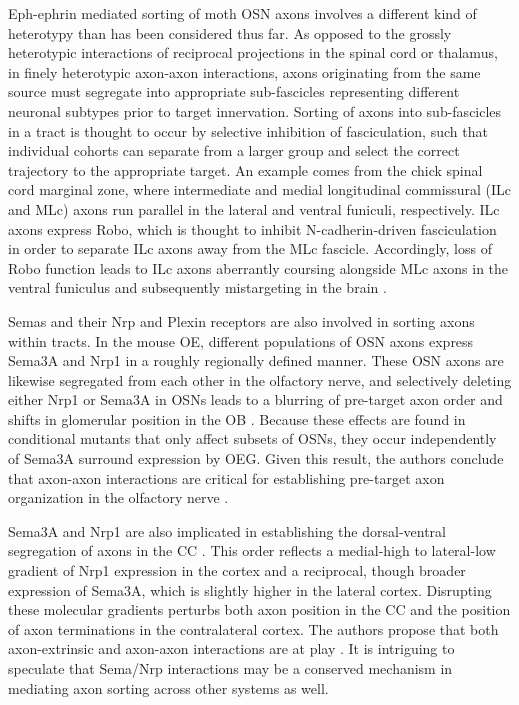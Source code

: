 Eph-ephrin mediated sorting of moth OSN axons involves a different kind of heterotypy than has been considered thus far.
As opposed to the grossly heterotypic interactions of reciprocal projections in the spinal cord or thalamus, in finely heterotypic axon-axon interactions, axons originating from the same source must segregate into appropriate sub-fascicles representing different neuronal subtypes prior to target innervation.
Sorting of axons into sub-fascicles in a tract is thought to occur by selective inhibition of fasciculation, such that individual cohorts can separate from a larger group and select the correct trajectory to the appropriate target.
An example comes from the chick spinal cord marginal zone, where intermediate and medial longitudinal commissural (ILc and MLc) axons run parallel in the lateral and ventral funiculi, respectively.
ILc axons express Robo, which is thought to inhibit N-cadherin-driven fasciculation in order to separate ILc axons away from the MLc fascicle.
Accordingly, loss of Robo function leads to ILc axons aberrantly coursing alongside MLc axons in the ventral funiculus and subsequently mistargeting in the brain \cite{sakai2012axon}.

Semas and their Nrp and Plexin receptors are also involved in sorting axons within tracts.
In the mouse OE, different populations of OSN axons express Sema3A and Nrp1 in a roughly regionally defined manner.
These OSN axons are likewise segregated from each other in the olfactory nerve, and selectively deleting either Nrp1 or Sema3A in OSNs leads to a blurring of pre-target axon order and shifts in glomerular position in the OB \cite{imai2009pre}.
Because these effects are found in conditional mutants that only affect subsets of OSNs, they occur independently of Sema3A surround expression by OEG.
Given this result, the authors conclude that axon-axon interactions are critical for establishing pre-target axon organization in the olfactory nerve \cite{imai2009pre}.

Sema3A and Nrp1 are also implicated in establishing the dorsal-ventral segregation of axons in the CC \cite{zhou2013axon}.
This order reflects a medial-high to lateral-low gradient of Nrp1 expression in the cortex and a reciprocal, though broader expression of Sema3A, which is slightly higher in the lateral cortex.
Disrupting these molecular gradients perturbs both axon position in the CC and the position of axon terminations in the contralateral cortex.
The authors propose that both axon-extrinsic and axon-axon interactions are at play \cite{zhou2013axon}.
It is intriguing to speculate that Sema/Nrp interactions may be a conserved mechanism in mediating axon sorting across other systems as well.